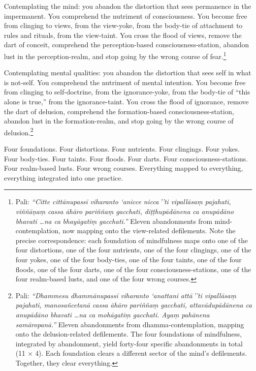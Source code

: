 Contemplating the mind: you abandon the distortion that sees permanence in the impermanent. You comprehend the nutriment of consciousness. You become free from clinging to views, from the view-yoke, from the body-tie of attachment to rules and rituals, from the view-taint. You cross the flood of views, remove the dart of conceit, comprehend the perception-based consciousness-station, abandon lust in the perception-realm, and stop going by the wrong course of fear.\footnote{Pali: \textit{``Citte cittānupassī viharanto `anicce nicca\,''ti vipallāsaṃ pajahati, viññāṇaṃ cassa āhāro pariññaṃ gacchati, diṭṭhupādānena ca anupādāno bhavati \ldots na ca bhayāgatiṃ gacchati.''} Eleven abandonments from mind-contemplation, now mapping onto the view-related defilements. Note the precise correspondence: each foundation of mindfulness maps onto one of the four distortions, one of the four nutrients, one of the four clingings, one of the four yokes, one of the four body-ties, one of the four taints, one of the four floods, one of the four darts, one of the four consciousness-stations, one of the four realm-based lusts, and one of the four wrong courses.}

Contemplating mental qualities: you abandon the distortion that sees self in what is not-self. You comprehend the nutriment of mental intention. You become free from clinging to self-doctrine, from the ignorance-yoke, from the body-tie of ``this alone is true,'' from the ignorance-taint. You cross the flood of ignorance, remove the dart of delusion, comprehend the formation-based consciousness-station, abandon lust in the formation-realm, and stop going by the wrong course of delusion.\footnote{Pali: \textit{``Dhammesu dhammānupassī viharanto `anattani attā\,''ti vipallāsaṃ pajahati, manosañcetanā cassa āhāro pariññaṃ gacchati, attavādupādānena ca anupādāno bhavati \ldots na ca mohāgatiṃ gacchati. Ayaṃ pahānena samāropanā.''} Eleven abandonments from dhamma-contemplation, mapping onto the delusion-related defilements. The four foundations of mindfulness, integrated by abandonment, yield forty-four specific abandonments in total (11 $\times$ 4). Each foundation clears a different sector of the mind's defilements. Together, they clear everything.}

\ornament

Four foundations. Four distortions. Four nutrients. Four clingings. Four yokes. Four body-ties. Four taints. Four floods. Four darts. Four consciousness-stations. Four realm-based lusts. Four wrong courses. Everything mapped to everything, everything integrated into one practice.

